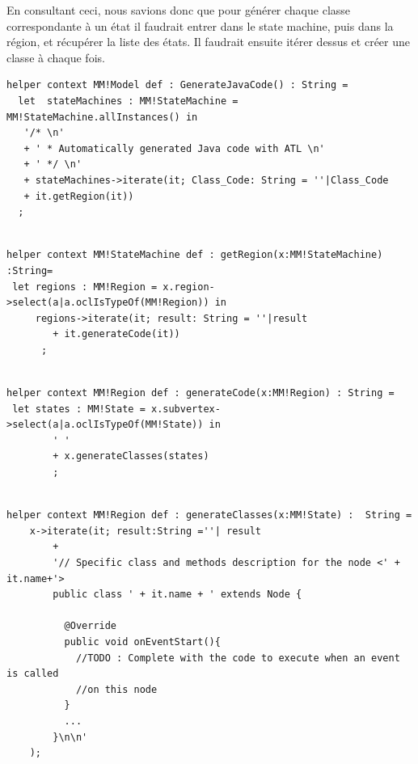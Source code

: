 \documentclass[french, 12pt, a4paper]{article}
\begin{document}
	En consultant ceci, nous savions donc que pour générer chaque classe correspondante à un état il faudrait entrer dans le state machine, puis dans la région, et récupérer la liste des états. Il faudrait ensuite itérer dessus et créer une classe à chaque fois.
	
	\begin{lstlisting}[caption={Méthode appelant la génération de code pour chaque State Machine du modèle},basicstyle=\small]
helper context MM!Model def : GenerateJavaCode() : String = 
  let  stateMachines : MM!StateMachine = MM!StateMachine.allInstances() in
   '/* \n'
   + ' * Automatically generated Java code with ATL \n'
   + ' */ \n'
   + stateMachines->iterate(it; Class_Code: String = ''|Class_Code 
   + it.getRegion(it))
  ;
  	\end{lstlisting}

      
  \begin{lstlisting}[caption={Méthode appelant la génération de code pour chaque Region du State Machine.},basicstyle=\small]

helper context MM!StateMachine def : getRegion(x:MM!StateMachine) :String=
 let regions : MM!Region = x.region->select(a|a.oclIsTypeOf(MM!Region)) in 
  	 regions->iterate(it; result: String = ''|result 
        + it.generateCode(it))
      ;
	\end{lstlisting}
	
  \begin{lstlisting}[caption={Méthode appelant la génération de code pour chaque State (état) de la région.},basicstyle=\small]

helper context MM!Region def : generateCode(x:MM!Region) : String = 
 let states : MM!State = x.subvertex->select(a|a.oclIsTypeOf(MM!State)) in
		' ' 
		+ x.generateClasses(states)
        ;
	\end{lstlisting}
	
  \begin{lstlisting}[caption={Méthode générant le code de chaque classe correspondante à un état du diagramme.},basicstyle=\small]

helper context MM!Region def : generateClasses(x:MM!State) :  String = 
	x->iterate(it; result:String =''| result
		+ 
        '// Specific class and methods description for the node <' + it.name+'>
    	public class ' + it.name + ' extends Node {
    	
    	  @Override
    	  public void onEventStart(){
    	    //TODO : Complete with the code to execute when an event is called
    	    //on this node
    	  }
    	  ...
    	}\n\n'		
    );

    \end{lstlisting}
    
\end{document}
